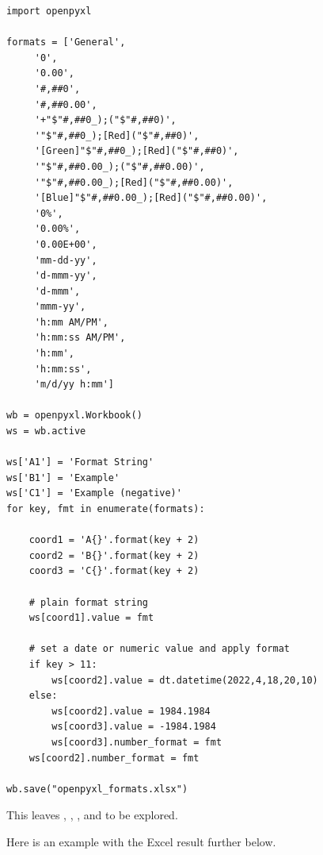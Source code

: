 \begin{lstlisting}
import openpyxl

formats = ['General',
     '0',
     '0.00',
     '#,##0',
     '#,##0.00',
     '+"$"#,##0_);("$"#,##0)',
     '"$"#,##0_);[Red]("$"#,##0)',
     '[Green]"$"#,##0_);[Red]("$"#,##0)',
     '"$"#,##0.00_);("$"#,##0.00)',
     '"$"#,##0.00_);[Red]("$"#,##0.00)',
     '[Blue]"$"#,##0.00_);[Red]("$"#,##0.00)',
     '0%',
     '0.00%',
     '0.00E+00',
     'mm-dd-yy',
     'd-mmm-yy',
     'd-mmm',
     'mmm-yy',
     'h:mm AM/PM',
     'h:mm:ss AM/PM',
     'h:mm',
     'h:mm:ss',
     'm/d/yy h:mm']

wb = openpyxl.Workbook()
ws = wb.active

ws['A1'] = 'Format String'
ws['B1'] = 'Example'
ws['C1'] = 'Example (negative)'
for key, fmt in enumerate(formats):
    
    coord1 = 'A{}'.format(key + 2)
    coord2 = 'B{}'.format(key + 2)
    coord3 = 'C{}'.format(key + 2)
    
    # plain format string
    ws[coord1].value = fmt
    
    # set a date or numeric value and apply format
    if key > 11:
        ws[coord2].value = dt.datetime(2022,4,18,20,10)
    else:
        ws[coord2].value = 1984.1984
        ws[coord3].value = -1984.1984
        ws[coord3].number_format = fmt
    ws[coord2].number_format = fmt

wb.save("openpyxl_formats.xlsx")
\end{lstlisting}

\noindent This leaves , , , and  to be explored. 

Here is an example with the Excel result further below. 

